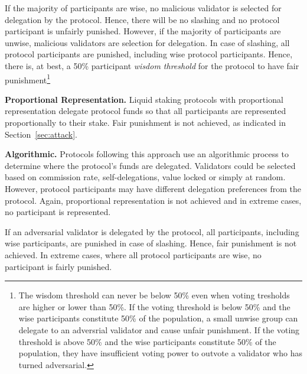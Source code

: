 If the majority of participants are wise, no malicious validator is
selected for delegation by the protocol. Hence, there will be no slashing and no
protocol participant is unfairly punished.
However, if the majority of participants are unwise, malicious validators
are selection for delegation. In case of slashing, all protocol participants
are punished, including wise protocol participants.
Hence, there is, at best, a 50\% participant \emph{wisdom threshold} for the protocol
to have fair punishment\footnote{The wisdom threshold can never be below 50\%
even when voting tresholds are higher or lower than 50\%.
If the voting threshold is below 50\% and the wise participants constitute
50\% of the population, a small unwise group
can delegate to an adversrial validator and cause unfair punishment.
If the voting threshold is above 50\% and the wise participants constitute
50\% of the population, they have insufficient voting power to outvote a
validator who has turned adversarial.}


\noindent
\textbf{Proportional Representation.}
Liquid staking protocols with proportional representation delegate
protocol funds so that all participants are represented proportionally
to their stake. Fair punishment is not achieved, as indicated in
Section~\ref{sec:attack}.



\noindent
\textbf{Algorithmic.}
Protocols following this approach use an algorithmic process to determine
where the protocol's funds are delegated. Validators could be selected based on
commission rate, self-delegations, value locked or simply at random.
However, protocol participants may have different delegation preferences from
the protocol. Again, proportional representation is not achieved and in
extreme cases, no participant is represented.

If an adversarial validator is delegated by the protocol, all participants,
including wise participants, are punished in case of slashing. Hence,
fair punishment is not achieved. In extreme cases, where all protocol
participants are wise, no participant is fairly punished.


